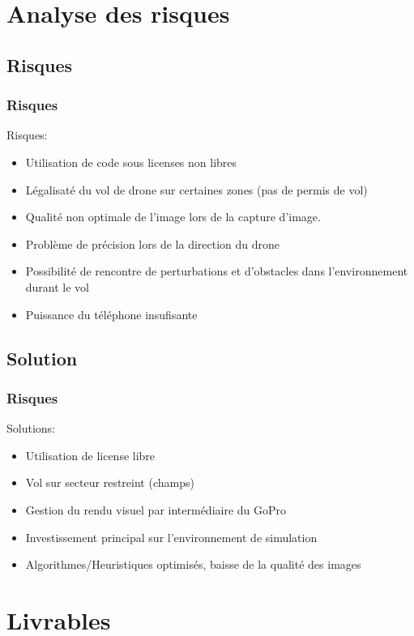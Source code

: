 \documentclass[transparent]{beamer}
\begin{document}
\section{Analyse des risques}
\subsection{Risques}
\begin{frame}
\frametitle{Risques}
	\begin{block}{Risques:}
		\begin{itemize}
			\item Utilisation de code sous licenses non libres
			\item Légalisaté du vol de drone sur certaines zones (pas de permis de vol)
			\item Qualité non optimale de l'image lors de la capture d'image.
			\item Problème de précision lors de la direction du drone
			\item Possibilité de rencontre de perturbations et d'obstacles dans l'environnement durant le vol
			\item Puissance du téléphone insufisante
		\end{itemize}
	\end{block}
\end{frame}
\subsection{Solution}
\begin{frame}
\frametitle{Risques}
	\begin{block}{Solutions:}
		\begin{itemize}
			\item Utilisation de license libre
			\item Vol sur secteur restreint (champs)
			\item Gestion du rendu visuel par intermédiaire du GoPro
			\item Investissement principal sur l'environnement de simulation
			\item Algorithmes/Heuristiques optimisés, baisse de la qualité des images
		\end{itemize}
	\end{block}
\end{frame}

\section{Livrables}
\end{document}
